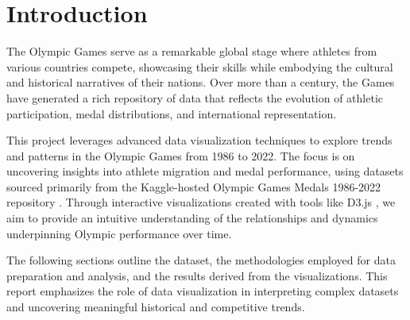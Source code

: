 \chapter{Introduction} \label{chap:intro}

The Olympic Games serve as a remarkable global stage where athletes from various countries compete, showcasing their skills while embodying the cultural and historical narratives of their nations. Over more than a century, the Games have generated a rich repository of data that reflects the evolution of athletic participation, medal distributions, and international representation.

This project leverages advanced data visualization techniques to explore trends and patterns in the Olympic Games from 1986 to 2022. The focus is on uncovering insights into athlete migration and medal performance, using datasets sourced primarily from the Kaggle-hosted Olympic Games Medals 1986-2022 repository \cite{olympic_19862022}. Through interactive visualizations created with tools like D3.js \cite{d3}, we aim to provide an intuitive understanding of the relationships and dynamics underpinning Olympic performance over time.

The following sections outline the dataset, the methodologies employed for data preparation and analysis, and the results derived from the visualizations. This report emphasizes the role of data visualization in interpreting complex datasets and uncovering meaningful historical and competitive trends.

